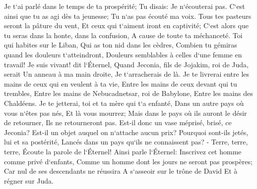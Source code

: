 \verse Je t`ai parlé dans le temps de ta prospérité; Tu disais: Je n`écouterai pas. C`est ainsi que tu as agi dès ta jeunesse; Tu n`as pas écouté ma voix. 
\verse Tous tes pasteurs seront la pâture du vent, Et ceux qui t`aiment iront en captivité; C`est alors que tu seras dans la honte, dans la confusion, A cause de toute ta méchanceté. 
\verse Toi qui habites sur le Liban, Qui as ton nid dans les cèdres, Combien tu gémiras quand les douleurs t`atteindront, Douleurs semblables à celles d`une femme en travail! 
\verse Je suis vivant! dit l`Éternel, Quand Jeconia, fils de Jojakim, roi de Juda, serait Un anneau à ma main droite, Je t`arracherais de là. 
\verse Je te livrerai entre les mains de ceux qui en veulent à ta vie, Entre les mains de ceux devant qui tu trembles, Entre les mains de Nebucadnetsar, roi de Babylone, Entre les mains des Chaldéens. 
\verse Je te jetterai, toi et ta mère qui t`a enfanté, Dans un autre pays où vous n`êtes pas nés, Et là vous mourrez; 
\verse Mais dans le pays où ils auront le désir de retourner, Ils ne retourneront pas. 
\verse Est-il donc un vase méprisé, brisé, ce Jeconia? Est-il un objet auquel on n`attache aucun prix? Pourquoi sont-ils jetés, lui et sa postérité, Lancés dans un pays qu`ils ne connaissent pas? - 
\verse Terre, terre, terre, Écoute la parole de l`Éternel! 
\verse Ainsi parle l`Éternel: Inscrivez cet homme comme privé d`enfants, Comme un homme dont les jours ne seront pas prospères; Car nul de ses descendants ne réussira A s`asseoir sur le trône de David Et à régner sur Juda. 

